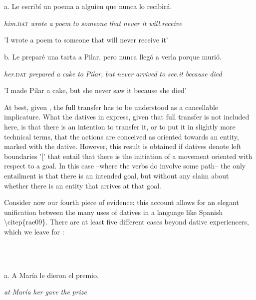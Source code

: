 \documentclass[output=paper,modfonts,nonflat]{langsci/langscibook}
\begin{document}
\ea%
    \label{ex:key:23}
    \gll\\
        \\
    \glt
    \z

          

a.   Le escribí un poema a alguien que nunca lo recibirá.

\textit{him.}\textsc{dat} \textit{wrote} \textit{a} \textit{poem} \textit{to} \textit{someone} \textit{that} \textit{never} \textit{it} \textit{will.receive}

{}'I wrote a poem to someone that will never receive it'

b.   Le preparé una tarta a Pilar, pero nunca llegó a verla porque murió.

      \textit{her.}\textsc{dat}   \textit{prepared} \textit{a} \textit{cake} \textit{to} \textit{Pilar,} \textit{but}  \textit{never}  \textit{arrived} \textit{to} \textit{see.it} \textit{because} \textit{died}

    {}'I made Pilar a cake, but she never saw it because she died'

At best, given , the full transfer has to be understood as a cancellable implicature. What the datives in  express, given that full transfer is not included here, is that there is an intention to transfer it, or to put it in slightly more technical terms, that the actions are conceived as oriented towards an entity, marked with the dative. However, this result is obtained if datives denote left boundaries '[' that entail that there is the initiation of a movement oriented with respect to a goal. In this case –where the verbs do involve some path– the only entailment is that there is an intended goal, but without any claim about whether there is an entity that arrives at that goal.

Consider now our fourth piece of evidence: this account allows for an elegant unification between the many uses of datives in a language like Spanish {\textbackslash}citep\{rae09\}. There are at least five different cases beyond dative experiencers, which we leave for :

\ea%
    \label{ex:key:24}
    \gll\\
        \\
    \glt
    \z

          a.   A María le     dieron el   premio.    

         \textit{at} \textit{María} \textit{her}   \textit{gave}    \textit{the}  \textit{prize}
\end{document}
